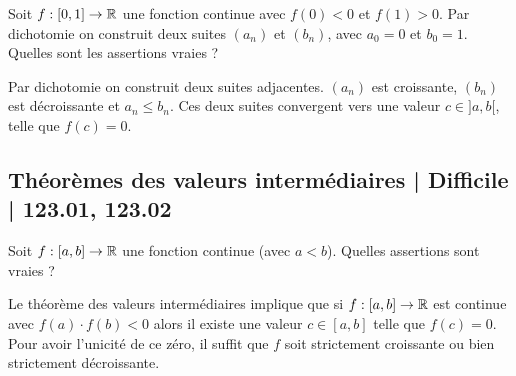 \begin{question}
Soit $f : [0,1] \to \mathbb{R}$ une fonction continue avec $f(0)<0$ et $f(1)>0$.
Par dichotomie on construit deux suites $(a_n)$ et $(b_n)$, avec $a_0 = 0$ et $b_0 = 1$. Quelles sont les assertions vraies ?
\begin{answers}



\end{answers}
\begin{explanations}
Par dichotomie on construit deux suites adjacentes. $(a_n)$ est croissante, $(b_n)$ est décroissante et $a_n \le b_n$. Ces deux suites convergent vers une valeur $c\in]a,b[$, telle que $f(c)=0$.
\end{explanations}
\end{question}



\subsection{Théorèmes des valeurs intermédiaires | Difficile | 123.01, 123.02}


\begin{question}
Soit $f : [a,b] \to \mathbb{R}$ une fonction continue (avec $a < b$). Quelles assertions sont vraies ? 
\begin{answers}



\end{answers}
\begin{explanations}
Le théorème des valeurs intermédiaires implique que si $f : [a,b] \to \mathbb{R}$ est continue avec $f(a) \cdot f(b) < 0$ alors
il existe une valeur $c \in [a,b]$ telle que $f(c)=0$. Pour avoir l'unicité de ce zéro, il suffit que $f$ soit strictement croissante ou bien strictement décroissante.
\end{explanations}
\end{question}


